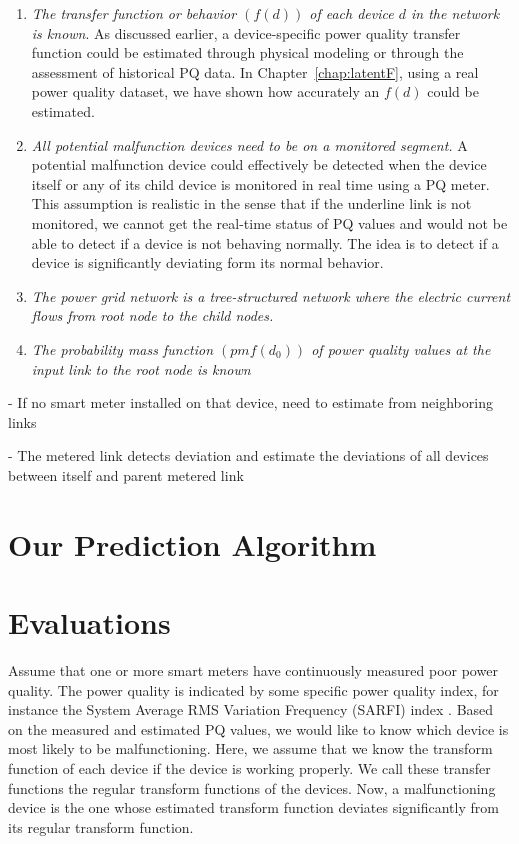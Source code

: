 \documentclass[12pt,oneside]{book}
\begin{document}
\begin{enumerate}
\item \textit{The transfer function or behavior $\left(f\left(d\right)\right)$ of each device $d$ in the network is known}. As discussed earlier, a device-specific power quality transfer function could be estimated through physical modeling or through the assessment of historical PQ data. In Chapter~\ref{chap:latentF}, using a real power quality dataset, we have shown how accurately an $f(d)$ could be estimated.
\item \textit{All potential malfunction devices need to be on a monitored segment.} A potential malfunction device could effectively be detected when the device itself or any of its child device is monitored in real time using a PQ meter. This assumption is realistic in the sense that if the underline link is not monitored, we cannot get the real-time status of PQ values and would not be able to detect if a device is not behaving normally. The idea is to detect if a device is significantly deviating form its normal behavior.

\item \textit{The power grid network is a tree-structured network where the electric current flows from root node to the child nodes.}
\item \textit{The probability mass function $\left(pmf\left(d_0\right)\right)$ of power quality values at the input link to the root node is known}
\end{enumerate}

- If no smart meter installed on that device, need to estimate from neighboring links

- The metered link detects deviation and estimate the deviations of all devices between itself and parent metered link


\section{Our Prediction Algorithm}


\section{Evaluations}
Assume that one or more smart meters have continuously measured poor power quality. The power quality is indicated by some specific power quality index, for instance the System Average RMS Variation Frequency (SARFI) index . Based on the measured and estimated PQ values, we would like to know which device is most likely to be malfunctioning. Here, we assume that we know the transform function of each device if the device is working properly. We call these transfer functions the regular transform functions of the devices. Now, a malfunctioning device is the one whose estimated transform function deviates significantly from its regular transform function.
\end{document}

